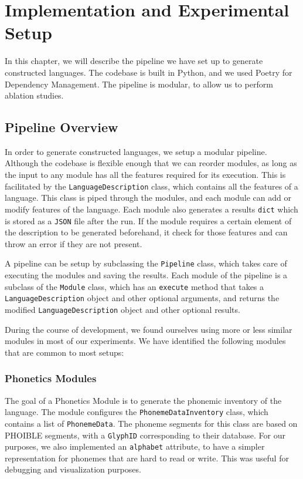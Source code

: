 \chapter{Implementation and Experimental Setup}\label{chapter:pipeline}

In this chapter, we will describe the pipeline we have set up to generate constructed languages. The codebase is built in Python, and we used Poetry
for Dependency Management. The pipeline is modular, to allow us to perform ablation studies.

\section{Pipeline Overview}
In order to generate constructed languages, we setup a modular pipeline. Although the codebase is flexible enough that we can reorder modules, as
long as the input to any module has all the features required for its execution. This is facilitated by the \texttt{LanguageDescription} class, which contains
all the features of a language. This class is piped through the modules, and each module can add or modify features of the language. Each module also generates a 
results \texttt{dict} which is stored as a \texttt{JSON} file after the run. If the module requires a certain element of the description to be 
generated beforehand, it check for those features and can throw an error if they are not present.

A pipeline can be setup by subclassing the \texttt{Pipeline} class, which takes care of executing the modules and saving the results. Each module of the pipeline 
is a subclass of the \texttt{Module} class, which has an \texttt{execute} method that takes a \texttt{LanguageDescription} object and other optional arguments,
and returns the modified \texttt{LanguageDescription} object and other optional results.

During the course of development, we found ourselves using more or less similar modules in most of our experiments. We have identified the following modules that are common to most
setups:

\subsection{Phonetics Modules}

The goal of a Phonetics Module is to generate the phonemic inventory of the language. The module configures the \texttt{PhonemeDataInventory} class, which
contains a list of \texttt{PhonemeData}. The phoneme segments for this class are based on PHOIBLE \cite{phoible} segments, with a \texttt{GlyphID} corresponding
to their database. For our purposes, we also implemented an \texttt{alphabet} attribute, to have a simpler representation for phonemes that are
hard to read or write. This was useful for debugging and visualization purposes.


